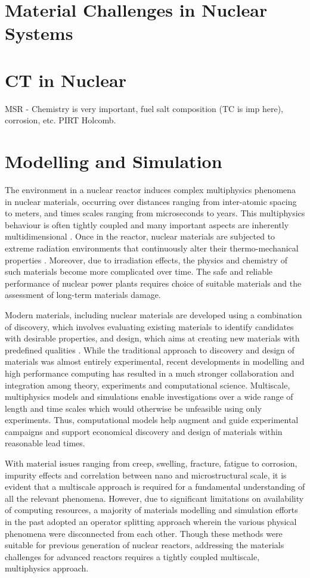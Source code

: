 	
\section{Material Challenges in Nuclear Systems}

\section{CT in Nuclear}

MSR - Chemistry is very important, fuel salt composition (TC is imp here), corrosion, etc. PIRT Holcomb.

\section{Modelling and Simulation}
	The environment in a nuclear reactor induces complex multiphysics phenomena in nuclear materials, occurring over distances ranging from inter-atomic spacing to meters, and times scales ranging from microseconds to years. This multiphysics behaviour is often tightly coupled and many important aspects are inherently multidimensional  \cite{WILLIAMSON2012149}. Once in the reactor, nuclear materials are subjected to extreme radiation environments that continuously alter their thermo-mechanical properties \cite{STAN200920}. Moreover, due to irradiation effects, the physics and chemistry of such materials become more complicated over time. The safe and reliable performance of nuclear power plants requires choice of suitable materials and the assessment of long-term materials damage.

	Modern materials, including nuclear materials are developed using a combination of discovery, which involves evaluating existing materials to identify candidates with desirable properties, and design, which aims at  creating new materials with predefined qualities \cite{STAN200920}. While the traditional approach to discovery and design of materials was almost entirely experimental, recent developments in modelling and high performance computing has resulted in a much stronger collaboration and integration among theory, experiments and computational science. Multiscale, multiphysics models and simulations enable investigations over  a wide range of length and time scales which would otherwise be unfeasible using only experiments. Thus, computational models help augment and guide experimental campaigns and support economical discovery and design of materials within reasonable lead times.

	With material issues ranging from creep, swelling, fracture, fatigue to corrosion, impurity  effects and correlation between nano and microstructural scale, it is evident that a multiscale approach is required for a fundamental understanding of all the relevant phenomena. However, due to significant limitations on availability of computing resources, a majority of materials modelling and simulation efforts in the past adopted an operator splitting approach wherein the various physical phenomena were disconnected from each other. Though these methods were suitable for previous generation of nuclear reactors, addressing the materials challenges for advanced reactors requires a tightly coupled multiscale, multiphysics approach.

